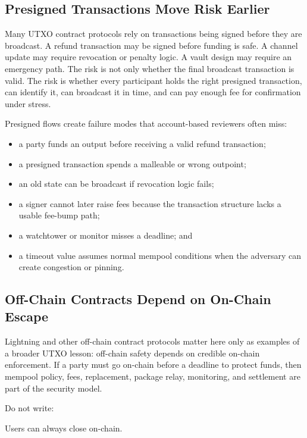\subsection{Presigned Transactions Move Risk Earlier}

Many UTXO contract protocols rely on transactions being signed before they are broadcast. A refund transaction may be signed before funding is safe. A channel update may require revocation or penalty logic. A vault design may require an emergency path. The risk is not only whether the final broadcast transaction is valid. The risk is whether every participant holds the right presigned transaction, can identify it, can broadcast it in time, and can pay enough fee for confirmation under stress.

Presigned flows create failure modes that account-based reviewers often miss:

\begin{itemize}
\item a party funds an output before receiving a valid refund transaction;
\item a presigned transaction spends a malleable or wrong outpoint;
\item an old state can be broadcast if revocation logic fails;
\item a signer cannot later raise fees because the transaction structure lacks a usable fee-bump path;
\item a watchtower or monitor misses a deadline; and
\item a timeout value assumes normal mempool conditions when the adversary can create congestion or pinning.
\end{itemize}

\subsection{Off-Chain Contracts Depend on On-Chain Escape}

Lightning and other off-chain contract protocols matter here only as examples of a broader UTXO lesson: off-chain safety depends on credible on-chain enforcement. If a party must go on-chain before a deadline to protect funds, then mempool policy, fees, replacement, package relay, monitoring, and settlement are part of the security model.

Do not write:

\begin{codeblock}
Users can always close on-chain.
\end{codeblock}

